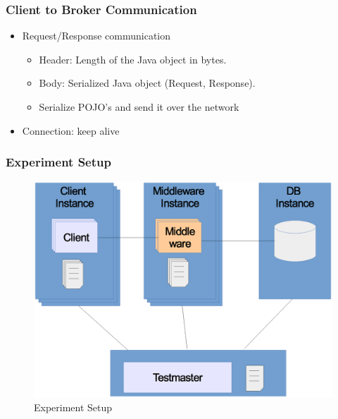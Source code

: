 \documentclass{beamer}
\begin{document}

\begin{frame}
\frametitle{Client to Broker Communication}

\begin{itemize}
\item Request/Response communication
\begin{itemize}
\item Header: Length of the Java object in bytes.
\item Body: Serialized Java object (Request, Response).
\item Serialize POJO's and send it over the network
\end{itemize}

\item Connection: keep alive
 
\end{itemize}
\end{frame}


\begin{frame}
\frametitle{Experiment Setup}
\begin{figure}
  \begin{center}
    \includegraphics[scale=0.4]{../../drawings/testsystem-overview.eps}
  \end{center}
  \caption{Experiment Setup}
  \label{fig:testsystem}
\end{figure}
\end{frame}


\end{document}
